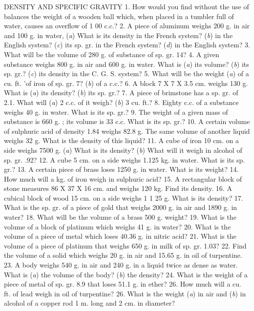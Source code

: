 DENSITY AND SPECIFIC GRAVITY
1. How would you find without the use of balances the weight of a wooden ball which, when placed in a tumbler full of water, causes an overflow of 1 00 c.c.?
2. A piece of aluminum weighs 200 g. in air and 100 g. in water, (\emph{a}) What is its density in the French system? (\emph{b}) in the English system? (\emph{c}) its sp. gr. in the French system? (\emph{d}) in the English system?
3. What will be the volume of 280 g. of substance of sp. gr. 14?
4. A given substance weighs 800 g. in air and 600 g. in water. What is (\emph{a}) its volume? (\emph{b}) its sp. gr.? (\emph{c}) its density in the C. G. S. system?
5. What will be the weight (\emph{a}) of a cu. ft. 'of iron of sp. gr. 7? (\emph{b}) of a c.c.?
6. A block 7 X 7 X 3.5 cm. weighs 130 g. What is (\emph{a}) its density? (\emph{b}) its sp. gr.?
7. A piece of brimstone has a sp. gr. of 2.1. What will (\emph{a}) 2 c.c. of it weigh? (\emph{b}) 3 cu. ft.?
8. Eighty c.c. of a substance weighs 40 g. in water. What is its sp. gr.?
9. The weight of a given mass of substance is 660 g. ; its volume is 33 c.c. What is its sp. gr.?
10. A certain volume of sulphuric acid of density 1.84 weighs 82.8 g. The same volume of another liquid weighs 32 g. What is the density of this liquid?
11. A cube of iron 10 cm. on a side weighs 7500 g. (\emph{a}) What is its density? (\emph{b}) What will it weigh in alcohol of sp. gr. .92?
12. A cube 5 cm. on a side weighs 1.125 kg. in water. What is its sp. gr.?
13. A certain piece of brass loses 1250 g. in water. What is its weight?
14. How much will a kg. of iron weigh in sulphuric acid?
15. A rectangular block of stone measures 86 X 37 X 16 cm. and weighs 120 kg. Find its density.
16. A cubical block of wood 15 cm. on a side weighs 1 1 25 g. What is its density?
17. What is the sp. gr. of a piece of gold that weighs 2000 g. in air and 1890 g. in water?
18. What will be the volume of a brass 500 g. weight?
19. What is the volume of a block of platinum which weighs 41 g. in water?
20. What is the volume of a piece of metal which loses 40.36 g. in nitric acid?
21. What is the volume of a piece of platinum that weighs 650 g. in milk of sp. gr. 1.03?
22. Find the volume of a solid which weighs 20 g. in air and 15.65 g. in oil of turpentine.
23. A body weighs 540 g. in air and 240 g. in a liquid twice as dense as water. What is (\emph{a}) the volume of the body? (\emph{b}) the density?
24. What is the weight of a piece of metal of sp. gr. 8.9 that loses 51.1 g. in ether?
26. How much will a cu. ft. of lead weigh in oil of turpentine?
26. What is the weight (\emph{a}) in air and (\emph{b}) in alcohol of a copper rod 1 m. long and 2 cm. in diameter?
